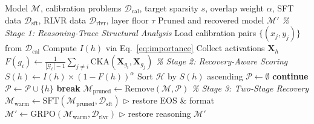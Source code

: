 \begin{algorithm}[t]
\caption{Recovery-Aware Structured Pruning (\rasp{})}
\label{alg:rasp}
\begin{algorithmic}[1]
\Require Model $\mathcal{M}$, calibration problems $\mathcal{D}_\text{cal}$, target sparsity $s$, overlap weight $\alpha$, SFT data $\mathcal{D}_\text{sft}$, RLVR data $\mathcal{D}_\text{rlvr}$, layer floor $\tau$
\Ensure Pruned and recovered model $\mathcal{M}'$
\Statex \textit{\% Stage 1: Reasoning-Trace Structural Analysis}
\State Load calibration pairs $\{(x_j, y_j)\}$ from $\mathcal{D}_\text{cal}$
    \State Compute $I(h)$ via Eq.~\eqref{eq:importance}
    \State Collect activations $\mathbf{X}_h$
\EndFor
{}
        \State $F(g_i) \gets \frac{1}{|\mathcal{G}_\ell|-1} \sum_{j \neq i} \text{CKA}(\mathbf{X}_{g_i}, \mathbf{X}_{g_j})$
    \EndFor
\EndFor
\Statex \textit{\% Stage 2: Recovery-Aware Scoring}
    \State $S(h) \gets I(h) \times (1 - F(h))^\alpha$
\EndFor
\State Sort $\mathcal{H}$ by $S(h)$ ascending
\State $\mathcal{P} \gets \emptyset$
        \State \textbf{continue}
    \EndIf
    \State $\mathcal{P} \gets \mathcal{P} \cup \{h\}$
        \State \textbf{break}
    \EndIf
\EndFor
\State $\mathcal{M}_\text{pruned} \gets \text{Remove}(\mathcal{M}, \mathcal{P})$
\Statex \textit{\% Stage 3: Two-Stage Recovery}
\State $\mathcal{M}_\text{warm} \gets \text{SFT}(\mathcal{M}_\text{pruned}, \mathcal{D}_\text{sft})$ \hfill $\triangleright$ restore EOS \& format
\State $\mathcal{M}' \gets \text{GRPO}(\mathcal{M}_\text{warm}, \mathcal{D}_\text{rlvr})$ \hfill $\triangleright$ restore reasoning
\State \Return $\mathcal{M}'$
\end{algorithmic}
\end{algorithm}
